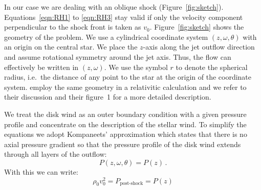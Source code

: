 In our case we are dealing with an oblique shock (Figure~\ref{fig:sketch}). Equations~\ref{eqn:RH1} to \ref{eqn:RH3} stay valid if only the velocity component perpendicular to the shock front is taken as $v_0$. 
Figure~\ref{fig:sketch} shows the geometry of the problem. We use a cylindrical coordinate system $(z, \omega, \theta)$ with an origin on the central star. We place the $z$-axis along the jet outflow direction and assume rotational symmetry around the jet axis. Thus, the flow can effectively be written in $(z,\omega)$. We use the symbol $r$ to denote the spherical radius, i.e.\ the distance of any point to the star at the origin of the coordinate system. 
\citet{2012MNRAS.422.2282K} employ the same geometry in a relativitic calculation and we refer to their discussion and their figure~1 for a more detailed description.

We treat the disk wind as an outer boundary condition with a given pressure profile and concentrate on the description of the stellar wind. To simplify the equations we adopt Kompaneets' approximation \citep{1960SPhD....5...46K} which states that there is no axial pressure gradient so that the pressure profile of the disk wind extends through all layers of the outflow:
\begin{equation}
P(z, \omega, \theta) = P(z)\,.
\end{equation}
With this we can write:
\begin{equation}\label{eqn:Pofz}
\rho_0 v_0^2 = P_{\textrm{post-shock}} = P(z)
\end{equation}
